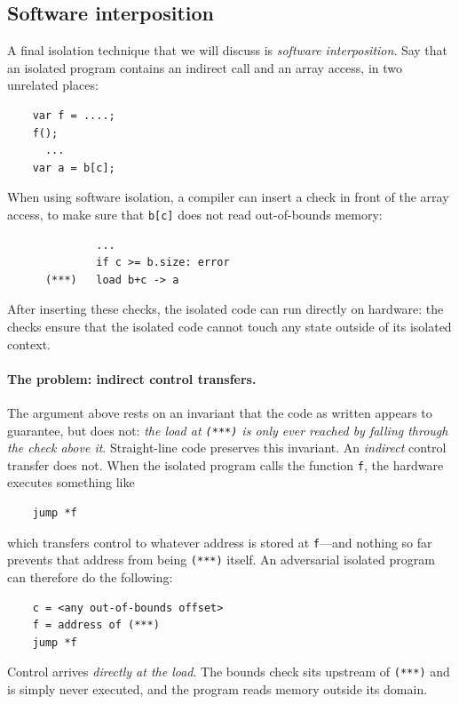 \subsection{Software interposition}
A final isolation technique that we will discuss is \emph{software
interposition}.  Say that an isolated program contains an indirect
call and an array access, in two unrelated places:
\begin{verbatim}
    var f = ....;
    f();
      ...
    var a = b[c];
\end{verbatim}
When using software isolation, a compiler can insert a check in front
of the array access, to make sure that \texttt{b[c]} does not read
out-of-bounds memory:
\begin{verbatim}
              ...
              if c >= b.size: error
      (***)   load b+c -> a
\end{verbatim}
After inserting these checks, the isolated code can run directly on
hardware: the checks ensure that the isolated code cannot touch any
state outside of its isolated context.

\paragraph{The problem: indirect control transfers.}
The argument above rests on an invariant that the code as written
appears to guarantee, but does not: \emph{the load at
\texttt{(***)} is only ever reached by falling through the check
above it}.  Straight-line code preserves this invariant.  An
\emph{indirect} control transfer does not.  When the isolated program
calls the function \texttt{f}, the hardware executes something like
\begin{verbatim}
    jump *f
\end{verbatim}
which transfers control to whatever address is stored at
\texttt{f}---and nothing so far prevents that address from being
\texttt{(***)} itself.  An adversarial isolated program can therefore
do the following:
\begin{verbatim}
    c = <any out-of-bounds offset>
    f = address of (***)
    jump *f
\end{verbatim}
Control arrives \emph{directly at the load}.  The bounds check sits
upstream of \texttt{(***)} and is simply never executed, and the
program reads memory outside its domain.

